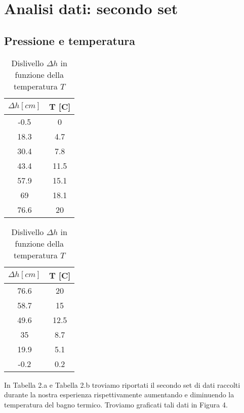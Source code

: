 \section{Analisi dati: secondo set}
\subsection{Pressione e temperatura}

\begin{table}[H]
\centering

	\begin{subtable}{.5\textwidth}
		\centering
		\begin{tabular}{|c|c|} \hline
			\textbf{$\Delta h {[cm]}$ } & \textbf{T {[\degree C]} }  \\ \hline
			-0.5 & 0  \\ \hline
			18.3 & 4.7  \\ \hline
			30.4 & 7.8  \\ \hline
			43.4 & 11.5  \\ \hline
			57.9 & 15.1  \\ \hline
			69 & 18.1  \\ \hline
			76.6 & 20  \\ \hline
		\end{tabular}
		\caption{Aumento della temperatura }
	\end{subtable}%
	\begin{subtable}{.5\textwidth}
	\centering
	\begin{tabular}{|c|c|} \hline
		\textbf{$\Delta h {[cm]}$ } & \textbf{T {[\degree C]} }  \\ \hline
		76.6 & 20  \\ \hline
		58.7 & 15  \\ \hline
		49.6 & 12.5  \\ \hline
		35 & 8.7  \\ \hline
		19.9 & 5.1  \\ \hline
		-0.2 & 0.2  \\ \hline
	\end{tabular}
	\caption{Diminuzione della temperatura }
\end{subtable}

\caption{Dislivello $\Delta h$ in funzione della temperatura $T$ }
\end{table}
In Tabella 2.a e Tabella 2.b troviamo riportati il secondo set di dati raccolti durante la nostra esperienza rispettivamente aumentando e diminuendo la temperatura del bagno termico.
Troviamo graficati tali dati in Figura 4. 


